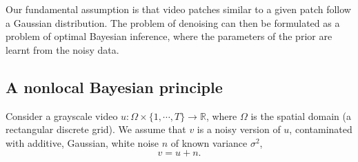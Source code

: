 \documentclass[10pt, journal, twocolumn, final, a4paper]{IEEEtran}
\newcommand{\ma}[1]{\boldsymbol{#1}}
\newcommand{\ie}{\emph{i.e}. } \newcommand{\Ie}{\emph{I.e}. }
\begin{document}
Our fundamental assumption is that video patches similar to a given
patch follow a Gaussian distribution.
The problem 
of denoising can then be formulated as a problem of optimal Bayesian inference, where the
parameters of the prior are learnt from the noisy data.

%



\subsection{A nonlocal Bayesian principle}

Consider a grayscale video $u:\Omega\times \{1,\cdots,T\}\rightarrow
\mathbb R$, where $\Omega$ is the spatial domain (a rectangular discrete grid).
We assume that $v$ is a noisy version of $u$, contaminated with additive,
Gaussian, white noise $n$ of known variance $\sigma^2$,
\[v = u + n.\]
\end{document}
